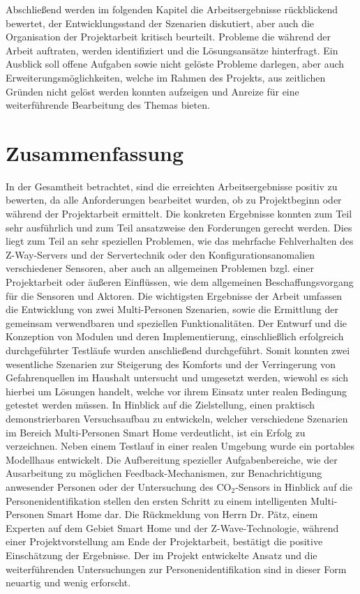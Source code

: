 \documentclass[12pt, oneside, smallheadings]{scrbook}
\begin{document}
Abschließend werden im folgenden Kapitel die Arbeitsergebnisse rückblickend bewertet, der Entwicklungsstand der Szenarien diskutiert, aber auch die Organisation der Projektarbeit kritisch beurteilt. Probleme die während der Arbeit auftraten, werden identifiziert und die Lösungsansätze hinterfragt. Ein Ausblick soll offene Aufgaben sowie nicht gelöste Probleme darlegen, aber auch Erweiterungsmöglichkeiten, welche im Rahmen des Projekts, aus zeitlichen Gründen nicht gelöst werden konnten aufzeigen und Anreize für eine weiterführende Bearbeitung des Themas bieten.

\section{Zusammenfassung}

In der Gesamtheit betrachtet, sind die erreichten Arbeitsergebnisse positiv zu bewerten, da alle Anforderungen bearbeitet wurden, ob zu Projektbeginn oder während der Projektarbeit ermittelt. Die konkreten Ergebnisse konnten zum Teil sehr ausführlich und zum Teil ansatzweise den Forderungen gerecht werden. Dies liegt zum Teil an sehr speziellen Problemen, wie das mehrfache Fehlverhalten des Z-Way-Servers und der Servertechnik oder den Konfigurationsanomalien verschiedener Sensoren, aber auch an allgemeinen Problemen bzgl. einer Projektarbeit oder äußeren Einflüssen, wie dem allgemeinen Beschaffungsvorgang für die Sensoren und Aktoren.
Die wichtigsten Ergebnisse der Arbeit umfassen die Entwicklung von zwei Multi-Personen Szenarien, sowie die Ermittlung der gemeinsam verwendbaren und speziellen Funktionalitäten. Der Entwurf und die Konzeption von Modulen und deren Implementierung, einschließlich erfolgreich durchgeführter Testläufe wurden anschließend durchgeführt. Somit konnten zwei wesentliche Szenarien zur Steigerung des Komforts und der Verringerung von Gefahrenquellen im Haushalt untersucht und umgesetzt werden, wiewohl es sich hierbei um Lösungen handelt, welche vor ihrem Einsatz unter realen Bedingung getestet werden müssen.
In Hinblick auf die Zielstellung, einen praktisch demonstrierbaren Versuchsaufbau zu entwickeln, welcher verschiedene Szenarien im Bereich Multi-Personen Smart Home verdeutlicht, ist ein Erfolg zu verzeichnen. Neben einem Testlauf in einer realen Umgebung wurde ein portables Modellhaus entwickelt.
Die Aufbereitung spezieller Aufgabenbereiche, wie der Ausarbeitung zu möglichen Feedback-Mechanismen, zur Benachrichtigung anwesender Personen oder der Untersuchung des CO$_2$-Sensors in Hinblick auf die Personenidentifikation stellen den ersten Schritt zu einem intelligenten Multi-Personen Smart Home dar.
Die Rückmeldung von Herrn Dr. Pätz, einem Experten auf dem Gebiet Smart Home und der Z-Wave-Technologie, während einer Projektvorstellung am Ende der Projektarbeit, bestätigt die positive Einschätzung der Ergebnisse. Der im Projekt entwickelte Ansatz und die weiterführenden Untersuchungen zur Personenidentifikation sind in dieser Form neuartig und wenig erforscht.\\
\end{document}
